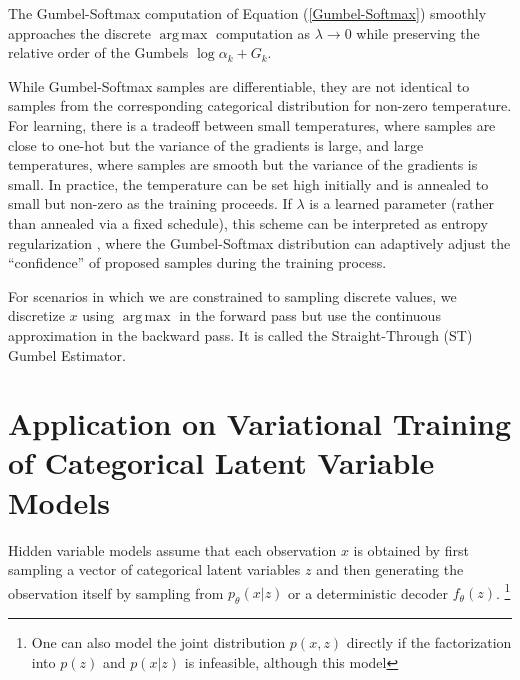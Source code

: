 \documentclass[11pt,a4paper]{article}
\DeclareMathOperator*{\argmax}{arg\,max}
\begin{document}
The Gumbel-Softmax computation of Equation (\ref{Gumbel-Softmax}) smoothly approaches the discrete $\argmax$ computation as $\lambda \to 0$ while preserving the relative order of the Gumbels $\log \alpha_k + G_k$.

While Gumbel-Softmax samples are differentiable, they are not identical to samples from the corresponding categorical distribution for non-zero temperature. For learning, there is a tradeoff between small temperatures, where samples are close to one-hot but the variance of the gradients is large, and large temperatures, where samples are smooth but the variance of the gradients is small. In practice, the temperature can be set high initially and is annealed to small but non-zero as the training proceeds. If $\lambda$ is a learned parameter (rather than annealed via a fixed schedule), this scheme can be interpreted as entropy regularization , where the Gumbel-Softmax distribution can adaptively adjust the ``confidence'' of proposed samples during the training process.

For scenarios in which we are constrained to sampling discrete values, we discretize $x$ using $\argmax$ in the forward pass but use the continuous approximation in the backward pass. It is called the Straight-Through (ST) Gumbel Estimator.


\section{Application on Variational Training of Categorical Latent Variable Models}


Hidden variable models assume that each observation $x$ is obtained by first sampling a vector of categorical latent variables $z$ and then generating the observation itself by sampling from $p_\theta(x|z)$ or a deterministic decoder $f_\theta(z)$. \footnote{One can also model the joint distribution $p(x,z)$ directly if the factorization into $p(z)$ and $p(x|z)$ is infeasible, although this model  } 
\end{document}
